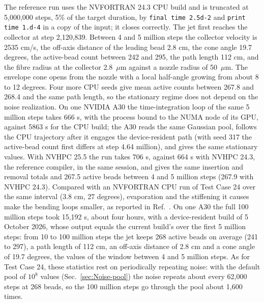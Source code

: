 The reference run uses the NVFORTRAN 24.3 CPU build and is truncated at
5,000,000 steps, 5\% of the target duration, by \texttt{final time 2.5d-2}
and \texttt{print time 1.d-4} in a copy of the input; it closes correctly.
The jet first reaches the collector at step 2,120,839.  Between 4 and
5 million steps the collector velocity is 2535 cm/s, the off-axis distance of the leading
bead 2.8 cm, the cone angle 19.7 degrees, the active-bead count between 242
and 295, the path length 112 cm, and the fibre radius at the collector
2.8~$\mu$m against a nozzle radius of 50~$\mu$m.  The envelope cone opens from
the nozzle with a local half-angle growing from about 8 to 12 degrees.  Four
more CPU seeds give mean active counts between 267.8 and 268.4 and the same
path length, so the stationary regime does not depend on the noise
realization.  On one NVIDIA A30 the time-integration loop of the same
5 million steps takes 666 s, with the process bound to the NUMA node of its
GPU, against 5863 s for the CPU build; the A30 reads the same Gaussian pool,
follows the CPU trajectory after it engages the device-resident path (with
seed 317 the active-bead count first differs at step 4.64 million), and gives the same
stationary values.  With NVHPC 25.5 the run takes 706 s, against 664 s with
NVHPC 24.3, the reference compiler, in the same session, and gives the same
insertion and removal totals and 267.5 active beads between 4 and 5 million
steps (267.9 with NVHPC 24.3).
Compared with an NVFORTRAN CPU run of Test Case 24 over the same interval
(3.8 cm, 27 degrees),
evaporation and the stiffening it causes make the bending loops smaller, as
reported in Ref.~\cite{yarin2001bending}.  On one A30 the full 100 million
steps took 15,192 s, about four hours, with a device-resident build of
5 October 2026, whose output equals the current build's over the first
5 million steps: from 10 to 100 million steps the jet keeps 268
active beads on average (241 to 297), a path length of 112 cm, an off-axis
distance of 2.8 cm and a cone angle of 19.7 degrees, the values of the window
between 4 and 5 million steps.  As for Test Case 24, these statistics rest
on periodically repeating noise: with the default pool of $10^{8}$ values
(Sec.~\ref{sec:Noise-pool}) the noise repeats about every 62,000 steps at
268 beads, so the 100 million steps go through the pool about 1,600 times.

